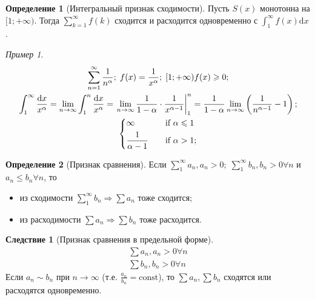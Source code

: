 \documentclass[a4paper,12pt]{article}
\theoremstyle{remark}
\newtheorem*{example}{Пример}
\theoremstyle{definition}
\newtheorem{definition}{Определение}
\newtheorem*{effect}{Следствие}
\begin{document}
\begin{definition}[Интегральный признак сходимости]
    Пусть \(S(x)\) монотонна на \([1;+\infty)\). Тогда \(\sum_{k = 1}^{\infty} f(k)\) сходится и расходится одновременно с \(\int_{1}^{\infty} \! f(x) \mathrm{d}x\).
\end{definition}

\begin{example}
    \begin{gather*}
        \sum_{n=1}^{\infty} \frac{1}{n^\alpha};\; f(x) = \frac{1}{x^\alpha};\; [1;+\infty) f(x) \geqslant 0; \\
        \int_{1}^{\infty} \frac{\mathrm{d}x}{x^\alpha} = \lim_{n \rightarrow \infty} \int_{1}^{n} \frac{\mathrm{d}x}{x^\alpha} = \left. \lim_{n \rightarrow \infty} \frac{1}{1 - \alpha} \cdot \frac{1}{x^{\alpha - 1}} \right |_1^n = \frac{1}{1 - \alpha} \lim_{n \rightarrow \infty} \left({\frac{1}{n^{\alpha - 1}} - 1}\right); \\
        \begin{dcases}
            \infty & \quad \text{if } \alpha \leqslant 1 \\
            \frac{1}{\alpha - 1} & \quad \text{if } \alpha > 1;
        \end{dcases}
    \end{gather*}
\end{example}


\begin{definition}[Признак сравнения]
    Если \(\sum_{1}^{\infty} a_n, a_n > 0;\; \sum_{1}^{\infty} b_n, b_n > 0 \forall n\) и \(a_n \leqslant b_n \forall n\), то
    \begin{itemize}
        \item из сходимости \(\sum_{1}^{\infty} b_n \Rightarrow \sum a_n\) тоже сходится;
        \item из расходимости \(\sum a_n \Rightarrow \sum b_n\) тоже расходится.
    \end{itemize}
\end{definition}

\begin{effect}[Признак сравнения в предельной форме]
    \begin{gather*}
        \sum a_n, a_n > 0 \forall n \\
        \sum b_n, b_n > 0 \forall n
    \end{gather*}
    Если \(a_n \sim b_n\) при \(n \rightarrow \infty\) (т.е. \(\frac{a_n}{b_n} = \text{const}\)), то \(\sum a_n, \sum b_n\) сходятся или расходятся одновременно.
\end{effect}
\end{document}
